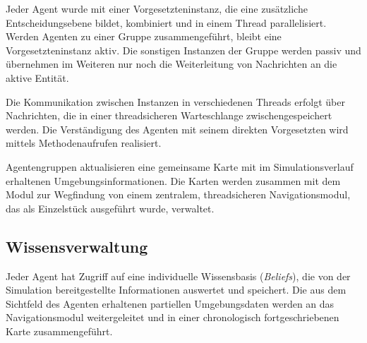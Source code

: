 \documentclass[runningheads]{llncs}
\begin{document}
Jeder Agent wurde mit einer Vorgesetzteninstanz, die eine zusätzliche Entscheidungsebene bildet, kombiniert und in einem Thread parallelisiert. Werden Agenten zu einer Gruppe zusammengeführt, bleibt eine Vorgesetzteninstanz aktiv. Die sonstigen Instanzen der Gruppe werden passiv und übernehmen im Weiteren nur noch die Weiterleitung von Nachrichten an die aktive Entität.

Die Kommunikation zwischen Instanzen in verschiedenen Threads erfolgt über Nachrichten, die in einer threadsicheren Warteschlange zwischengespeichert werden. Die Verständigung des Agenten mit seinem direkten Vorgesetzten wird mittels Methodenaufrufen realisiert.

Agentengruppen aktualisieren eine gemeinsame Karte mit im Simulationsverlauf erhaltenen Umgebungsinformationen. Die Karten werden zusammen mit dem Modul zur Wegfindung von einem zentralem, threadsicheren Navigationsmodul, das als Einzelstück ausgeführt wurde, verwaltet. 


\subsection{Wissensverwaltung}\label{wissensverwaltung}
Jeder Agent hat Zugriff auf eine individuelle Wissensbasis (\textit{Beliefs}), die von der Simulation bereitgestellte Informationen auswertet und speichert.
Die aus dem Sichtfeld des Agenten erhaltenen partiellen Umgebungsdaten werden an das Navigationsmodul weitergeleitet und in einer chronologisch fortgeschriebenen Karte zusammengeführt.
\end{document}
